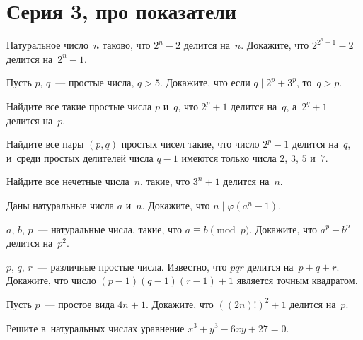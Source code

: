 

\section*{Серия 3, про показатели}


\begin{problems}

\item
Натуральное число~$n$ таково, что $2^n - 2$ делится на~$n$.
Докажите, что $2^{2^n-1} - 2$ делится на~$2^n - 1$.

\item
Пусть $p$, $q$~--- простые числа, $q > 5$.
Докажите, что если $q \mid 2^p + 3^p$, то~$q > p$.

\item
Найдите все такие простые числа $p$ и~$q$, что $2^p + 1$ делится на~$q$,
а~$2^q + 1$ делится на~$p$.

\item
Найдите все пары $(p, q)$ простых чисел такие, что число $2^p-1$ делится
на~$q$, и~среди простых делителей числа $q - 1$ имеются только числа
$2$, $3$, $5$ и~$7$.

\item
Найдите все нечетные числа~$n$, такие, что $3^n + 1$ делится на~$n$.

\item
Даны натуральные числа $a$ и~$n$.
Докажите, что $n \mid \varphi(a^n - 1)$.

\item
$a$, $b$, $p$~--- натуральные числа, такие, что $a \equiv b \pmod{p}$.
Докажите, что $a^p - b^p$ делится на~$p^2$.

\item
$p$, $q$, $r$~--- различные простые числа.
Известно, что $p q r$ делится на~$p + q + r$.
Докажите, что число $(p - 1) (q - 1) (r - 1) + 1$ является точным квадратом.

\item
Пусть $p$~--- простое вида $4 n + 1$.
Докажите, что $((2n)!)^2 + 1$ делится на~$p$.

\item
Решите в~натуральных числах уравнение $x^3 + y^3 - 6 x y + 27 = 0$.

\end{problems}

